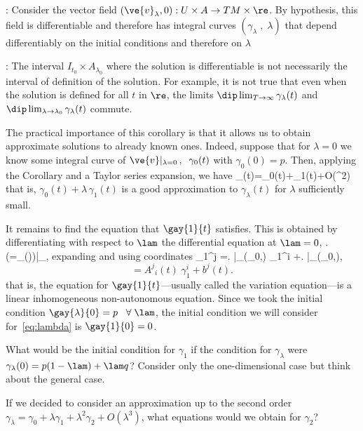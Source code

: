 \pru: Consider the vector field $(\ve{v}_{\lambda},0):U\times
A \to TM\times \re$. By hypothesis, this field is differentiable and therefore
has integral curves $(\gamma_{\lambda}\;,\; \lambda)$ that
depend differentiably on the initial conditions and therefore on $\lambda$ 
\epru

\espa
\noi{}: The interval $I_{t_0}\times A_{\lambda_0}$ where
the solution is differentiable is not necessarily the interval of
definition of the solution. For example, it is not true that even
when the solution is defined for all $t$ in $\re$, the limits $\dip \lim_{T\to \infty}\gamma_{\lambda}(t)$ and $ \dip
\lim_{\lambda \to \lambda_0}\gamma_{\lambda}(t) $ commute.

The practical importance of this corollary is that it allows us to
obtain approximate solutions to already known ones. Indeed,
suppose that for $\lambda=0$ we know some integral curve of
$\ve{v}|_{\lambda=0}\,,\;\;\gamma_0(t)$ with $\gamma_0(0)=p$. Then,
applying the Corollary and a Taylor series expansion, we have 
 \beq 
 \gamma_{\lambda}(t)=\gamma_0(t)+\lambda\;\gamma_1(t)+O(\lambda^2)
 \eeq
 \noi that is, $\gamma_0(t)+\lambda\,\gamma_1(t)$ is a good
approximation to $\gamma_{\lambda}(t) $ for $ \lambda$ sufficiently
small.

It remains to find the equation that $\gay{1}{t}$ satisfies.
This is obtained by differentiating with respect to $\lam$ the differential
equation at $\lam =0$,
\beq
\der{\lambda}\left.\left(=_{\lambda}()\right)\right|_{},
\eeq
expanding and using coordinates
\beq
{}\gamma_1^j =\left.  \right|_{(\gamma_0,)}\cdot
\gamma_1^i +\left. \right|_{(\gamma_0,)},
\eeq
$$
=A^j{}_{i}(t)\;\gamma_1^i +b^j(t).   \label{eq:lambda}
$$
\noi that is, the equation for $\gay{1}{t}$---usually called the variation equation---is a linear inhomogeneous non-autonomous equation. Since
we took the initial condition $\gay{\lambda}{0}=p\;\;\;\forall\;\lam$, 
the initial condition we will consider for~\ref{eq:lambda} is $\gay{1}{0}=0$.
\espa



\bpro 
What would be the initial condition for $\gamma_1$ if the
condition for $\gamma_{\lambda}$ were 
$ \gamma_{\lambda}(0)=p(1-\lam)+\lam q$? 
Consider only the one-dimensional case but think about the general case. 
\epro

\bpro
If we decided to consider an approximation up to the second
order $\gamma_{\lambda}=\gamma_0 +\lambda\gamma_1+\lambda^2\gamma_2+O(\lambda^3)$, what
equations would we obtain for $\gamma_2$?
\epro

